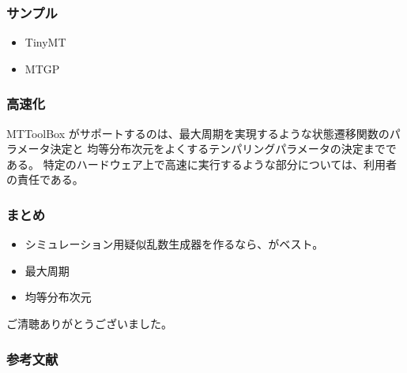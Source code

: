 \documentclass[cjk, dvips, handout, trans, xcolor=dvipsnames]{beamer}
\begin{document}
\begin{frame}[t]
  \frametitle{サンプル}

  \begin{itemize}
  \item TinyMT
  \item MTGP
  \end{itemize}
\end{frame}

\begin{frame}[t]
  \frametitle{高速化}

  MTToolBox がサポートするのは、最大周期を実現するような状態遷移関数のパラメータ決定と
  均等分布次元をよくするテンパリングパラメータの決定までである。
  特定のハードウェア上で高速に実行するような部分については、利用者の責任である。

\end{frame}

\begin{frame}[t]
  \frametitle{まとめ}

  \begin{itemize}[<+->]
  \item シミュレーション用疑似乱数生成器を作るなら、\FLPRNG がベスト。
  \item 最大周期
  \item 均等分布次元
  \end{itemize}
\end{frame}


\begin{frame}[c]
  \begin{center}\Large
    ご清聴ありがとうございました。
  \end{center}
\end{frame}

\begin{frame}[t]
  \frametitle{参考文献}
  
  
\end{frame}
\end{document}

